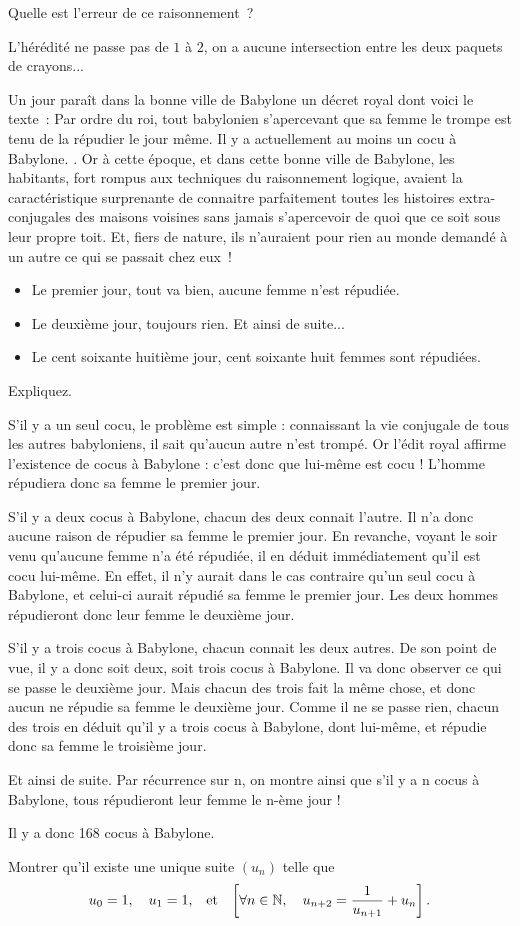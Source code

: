 \documentclass{magnolia}
\begin{document}
Quelle est l'erreur de ce raisonnement~?

\begin{sol}
L'hérédité ne passe pas de $1$ à $2$, on a aucune intersection entre les deux paquets de crayons...
\end{sol}

Un jour paraît dans la bonne ville de Babylone un décret royal dont voici
le texte~:
\og Par ordre du roi, tout babylonien s'apercevant que sa femme le trompe est
tenu de la répudier le jour même.  Il y a actuellement au moins un cocu à
Babylone. \fg.
Or à cette époque, et dans cette bonne ville de Babylone, les habitants, fort
rompus aux techniques du raisonnement logique, avaient la caractéristique
surprenante de connaitre parfaitement toutes les histoires extra-conjugales
des maisons voisines sans jamais s'apercevoir de quoi que ce soit sous leur
propre toit. Et, fiers de nature, ils n'auraient pour rien au monde demandé
à un autre ce qui se passait chez eux~!
\begin{itemize}
\item Le premier jour, tout va bien, aucune femme n'est répudiée.
\item Le deuxième jour, toujours rien. Et ainsi de suite...
\item Le cent soixante huitième jour, cent soixante huit femmes sont répudiées.
\end{itemize}
Expliquez.

\begin{sol}

    S'il y a un seul cocu, le problème est simple : connaissant la vie conjugale de tous les autres babyloniens, il sait qu'aucun autre n'est trompé. Or l'édit royal affirme l'existence de cocus à Babylone : c'est donc que lui-même est cocu !
    L'homme répudiera donc sa femme le premier jour.
    
    
    S'il y a deux cocus à Babylone, chacun des deux connait l'autre. Il n'a donc aucune raison de répudier sa femme le premier jour. En revanche, voyant le soir venu qu'aucune femme n'a été répudiée, il en déduit immédiatement qu'il est cocu lui-même.
    En effet, il n'y aurait dans le cas contraire qu'un seul cocu à Babylone, et celui-ci aurait répudié sa femme le premier jour.
    Les deux hommes répudieront donc leur femme le deuxième jour.
    
    
    
    S'il y a trois cocus à Babylone, chacun connait les deux autres. De son point de vue, il y a donc soit deux, soit trois cocus à Babylone. Il va donc observer ce qui se passe le deuxième jour. Mais chacun des trois fait la même chose, et donc aucun ne répudie sa femme le deuxième jour.
    Comme il ne se passe rien, chacun des trois en déduit qu'il y a trois cocus à Babylone, dont lui-même, et répudie donc sa femme le troisième jour.
    
    
    Et ainsi de suite. Par récurrence sur n, on montre ainsi que s'il y a n cocus à Babylone, tous répudieront leur femme le n-ème jour !
    
    Il y a donc 168 cocus à Babylone.


\end{sol}


Montrer qu'il existe une unique suite $(u_n)$ telle que
\[u_0=1,\quad u_1=1, \quad\!\text{et}\quad\! \left[\forall n\in\mathbb{N},\quad u_{n+2}=\frac{1}{u_{n+1}}+u_n\right].\]

\end{document}
